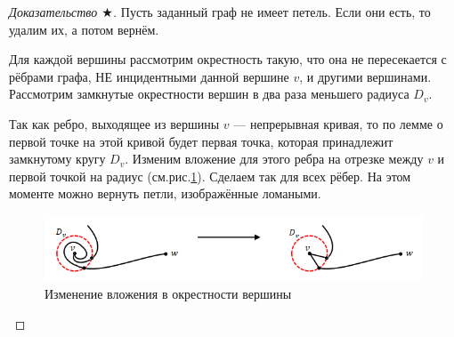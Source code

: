 \begin{proof}[Доказательство $\bigstar$]
    
    




    Пусть заданный граф не имеет петель. Если они есть, то удалим их, а потом вернём.

    Для каждой вершины рассмотрим окрестность такую, что она не пересекается с рёбрами графа, НЕ инцидентными данной вершине $v$, и другими вершинами. Рассмотрим замкнутые окрестности вершин в два раза меньшего радиуса $D_v$.

    Так как ребро, выходящее из вершины $v$ — непрерывная кривая, то по лемме о первой точке на этой кривой будет первая точка, которая принадлежит замкнутому кругу $D_v$. Изменим вложение для этого ребра на отрезке между $v$ и первой точкой на радиус (см.рис.\ref{fig:c3.6}). Сделаем так для всех рёбер. На этом моменте можно вернуть петли, изображённые ломаными.

    \begin{figure}[h]
        \centering
        \includegraphics[scale=0.7]{images/c3.6.png}
        \caption{Изменение вложения в окрестности вершины}
        \label{fig:c3.6}
    \end{figure}


\end{proof}
